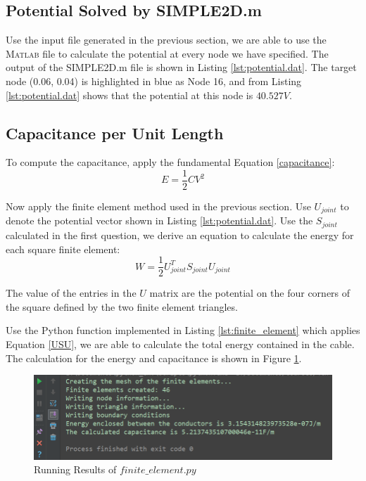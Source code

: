 \documentclass[a4paper,titlepage]{article}
\newcommand{\MATLAB}{\textsc{Matlab}\xspace}
\begin{document}
		\subsection{Potential Solved by SIMPLE2D.m}
			Use the input file generated in the previous section, we are able to use the \MATLAB file to calculate the potential at every node we have specified. The output of the SIMPLE2D.m file is shown in Listing \ref{lst:potential.dat}. The target node (0.06, 0.04) is highlighted in blue as Node 16, and from Listing \ref{lst:potential.dat} shows that the potential at this node is $40.527V$.
			
		\subsection{Capacitance per Unit Length}\label{find_capacitance}
			To compute the capacitance, apply the fundamental Equation \ref{capacitance}: 
			\begin{equation}
				E = \frac{1}{2} CV^2
				\label{capacitance}
			\end{equation}
			
			Now apply the finite element method used in the previous section. Use $U_{joint}$ to denote the potential vector shown in Listing \ref{lst:potential.dat}. Use the $S_{joint}$ calculated in the first question, we derive an equation to calculate the energy for each square finite element:
			\begin{equation}
				W = \frac{1}{2}U^T_{joint}S_{joint}U_{joint}
				\label{USU}
			\end{equation}
			
			The value of the entries in the $U$ matrix are the potential on the four corners of the square defined by the two finite element triangles.
			
			Use the Python function implemented in Listing \ref{lst:finite_element} which applies Equation \ref{USU}, we are able to calculate the total energy contained in the cable. The calculation for the energy and capacitance is shown in Figure \ref{q2_run}.
			\begin{figure}[!h]
				\centering
				\includegraphics[width=0.7\linewidth]{q2_run}
				\caption{Running Results of $finite\_element.py$}
				\label{q2_run}
			\end{figure}
			
\end{document}
